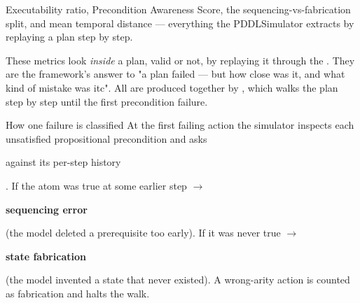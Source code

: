Executability ratio, Precondition Awareness Score, the sequencing-vs-fabrication split, and mean temporal distance --- everything the PDDLSimulator extracts by replaying a plan step by step.

These metrics look \emph{inside} a plan, valid or not, by replaying it through the . They are the framework's answer to "a plan failed --- but how close was it, and what kind of mistake was itc". All are produced together by , which walks the plan step by step until the first precondition failure.

\begin{bmkeybox}{How one failure is classified}
At the first failing action the simulator inspects each unsatisfied propositional precondition and asks


against its per-step history


. If the atom was true at some earlier step \(\rightarrow\)

\textbf{sequencing error}

(the model deleted a prerequisite too early). If it was never true \(\rightarrow\)

\textbf{state fabrication}

(the model invented a state that never existed). A wrong-arity action is counted as fabrication and halts the walk.
\end{bmkeybox}


